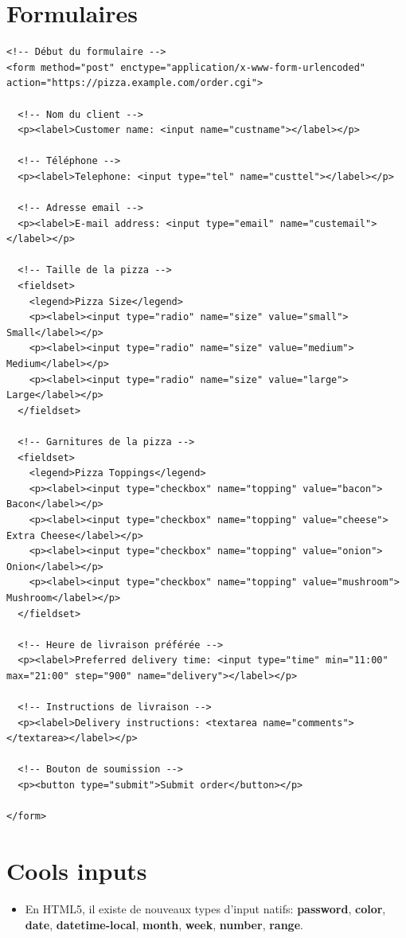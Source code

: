 \documentclass{report}
\begin{document}
\section{Formulaires}
\begin{lstlisting}[style=HTMLDraculaDark]
<!-- Début du formulaire -->
<form method="post" enctype="application/x-www-form-urlencoded" action="https://pizza.example.com/order.cgi">

  <!-- Nom du client -->
  <p><label>Customer name: <input name="custname"></label></p>
  
  <!-- Téléphone -->
  <p><label>Telephone: <input type="tel" name="custtel"></label></p>
  
  <!-- Adresse email -->
  <p><label>E-mail address: <input type="email" name="custemail"></label></p>

  <!-- Taille de la pizza -->
  <fieldset>
    <legend>Pizza Size</legend>
    <p><label><input type="radio" name="size" value="small"> Small</label></p>
    <p><label><input type="radio" name="size" value="medium"> Medium</label></p>
    <p><label><input type="radio" name="size" value="large"> Large</label></p>
  </fieldset>

  <!-- Garnitures de la pizza -->
  <fieldset>
    <legend>Pizza Toppings</legend>
    <p><label><input type="checkbox" name="topping" value="bacon"> Bacon</label></p>
    <p><label><input type="checkbox" name="topping" value="cheese"> Extra Cheese</label></p>
    <p><label><input type="checkbox" name="topping" value="onion"> Onion</label></p>
    <p><label><input type="checkbox" name="topping" value="mushroom"> Mushroom</label></p>
  </fieldset>

  <!-- Heure de livraison préférée -->
  <p><label>Preferred delivery time: <input type="time" min="11:00" max="21:00" step="900" name="delivery"></label></p>
  
  <!-- Instructions de livraison -->
  <p><label>Delivery instructions: <textarea name="comments"></textarea></label></p>
  
  <!-- Bouton de soumission -->
  <p><button type="submit">Submit order</button></p>
  
</form>
\end{lstlisting}


\section{Cools inputs}

\begin{itemize}
    \item En HTML5, il existe de nouveaux types d'input natifs: \textbf{password}, \textbf{color}, \textbf{date}, \textbf{datetime-local}, \textbf{month}, \textbf{week}, \textbf{number}, \textbf{range}.
\end{itemize}
\end{document}
